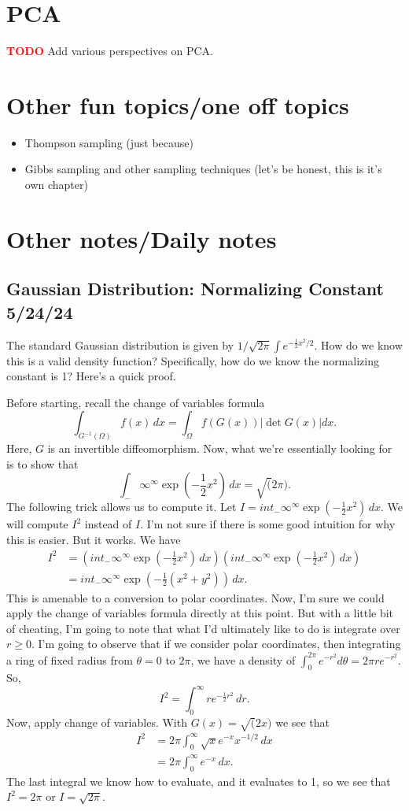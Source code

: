\documentclass{book}
\newcommand{\dx}{\, dx}
\newcommand{\dr}{\, dr}
\def\myred#1{\textbf{\textcolor{red}{#1}}}
\begin{document}
\chapter{PCA}
\myred{TODO} Add various perspectives on PCA. 


\chapter{Other fun topics/one off topics}
\begin{itemize}
  \item Thompson sampling (just because)
  \item Gibbs sampling and other sampling techniques (let's be honest, this is it's own chapter)
\end{itemize}

\chapter{Other notes/Daily notes}
\section{Gaussian Distribution: Normalizing Constant 5/24/24}
The standard Gaussian distribution is given by $1/\sqrt{2\pi}\int e^{-\frac{1}{2}x^2/2}$. How do we know this is a valid density function? Specifically, how do we know the normalizing constant is 1? Here's a quick proof. 

Before starting, recall the change of variables formula
$$
\int_{G^{-1}(\Omega)} f(x)\dx = \int_\Omega f(G(x))|\det G(x)|dx.
$$
Here, $G$ is an invertible diffeomorphism. Now, what we're essentially looking for is to show that
$$
\int_-\infty^\infty \exp(-\frac{1}{2}x^2)\dx = \sqrt(2\pi). 
$$
The following trick allows us to compute it. Let $I = int_-\infty^\infty \exp(-\frac{1}{2}x^2)\dx$. We will compute $I^2$ instead of $I$. I'm not sure if there is some good intuition for why this is easier. But it works. We have
\begin{align}
I^2 & = \left( int_-\infty^\infty \exp(-\frac{1}{2}x^2)\dx \right)\left( int_-\infty^\infty \exp(-\frac{1}{2}x^2)\dx \right)\\
& = int_-\infty^\infty \exp(-\frac{1}{2}(x^2+ y^2))\dx.
\end{align}
This is amenable to a conversion to polar coordinates. Now, I'm sure we could apply the change of variables formula directly at this point. But with a little bit of cheating, I'm going to note that what I'd ultimately like to do is integrate over $r\geq 0$. I'm going to observe that if we consider polar coordinates, then integrating a ring of fixed radius from $\theta=0$ to $2\pi$, we have a density of $\int_0^{2\pi} e^{-r^2} d\theta = 2\pi r e^{-r^2}$. So, 
$$
I^2 = \int_{0}^\infty r e^{-\frac{1}{2}r^2}\dr.
$$
Now, apply change of variables. With $G(x) = \sqrt(2x)$ we see that
\begin{align}
I^2 & = 2\pi\int_{0}^\infty \sqrt{x} e^{-x} x^{-1/2} \dx\\
& = 2\pi \int_0^\infty e^{-x}\dx.
\end{align}
The last integral we know how to evaluate, and it evaluates to 1, so we see that $I^2 = 2\pi$ or $I = \sqrt{2\pi}$. 
\end{document}
